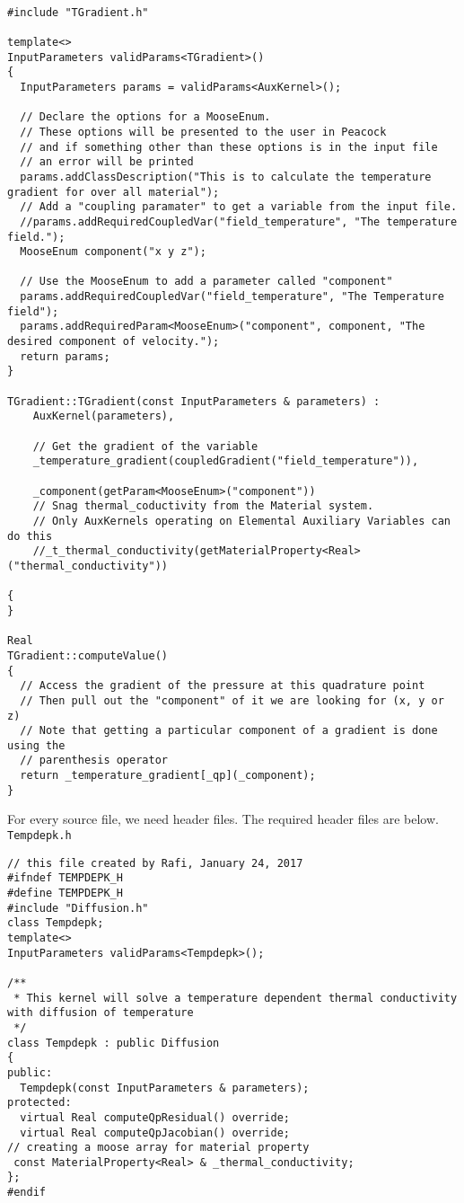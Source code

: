 \begin{lstlisting}

#include "TGradient.h"

template<>
InputParameters validParams<TGradient>()
{
  InputParameters params = validParams<AuxKernel>();

  // Declare the options for a MooseEnum.
  // These options will be presented to the user in Peacock
  // and if something other than these options is in the input file
  // an error will be printed
  params.addClassDescription("This is to calculate the temperature gradient for over all material");
  // Add a "coupling paramater" to get a variable from the input file.
  //params.addRequiredCoupledVar("field_temperature", "The temperature field.");
  MooseEnum component("x y z");

  // Use the MooseEnum to add a parameter called "component"
  params.addRequiredCoupledVar("field_temperature", "The Temperature field");
  params.addRequiredParam<MooseEnum>("component", component, "The desired component of velocity.");
  return params;
}

TGradient::TGradient(const InputParameters & parameters) :
    AuxKernel(parameters),

    // Get the gradient of the variable
    _temperature_gradient(coupledGradient("field_temperature")),

	_component(getParam<MooseEnum>("component"))
    // Snag thermal_coductivity from the Material system.
    // Only AuxKernels operating on Elemental Auxiliary Variables can do this
    //_t_thermal_conductivity(getMaterialProperty<Real>("thermal_conductivity"))

{
}

Real 
TGradient::computeValue()
{
  // Access the gradient of the pressure at this quadrature point
  // Then pull out the "component" of it we are looking for (x, y or z)
  // Note that getting a particular component of a gradient is done using the
  // parenthesis operator
  return _temperature_gradient[_qp](_component);
}
\end{lstlisting}
\pagebreak
For every source file, we need header files. The required header files are below.
\texttt{Tempdepk.h}
\lstset{style=cpp}
\begin{lstlisting}
// this file created by Rafi, January 24, 2017
#ifndef TEMPDEPK_H
#define TEMPDEPK_H
#include "Diffusion.h"
class Tempdepk;
template<>
InputParameters validParams<Tempdepk>();

/**
 * This kernel will solve a temperature dependent thermal conductivity with diffusion of temperature
 */
class Tempdepk : public Diffusion
{
public:
  Tempdepk(const InputParameters & parameters);
protected:
  virtual Real computeQpResidual() override;
  virtual Real computeQpJacobian() override;
// creating a moose array for material property
 const MaterialProperty<Real> & _thermal_conductivity;
};
#endif 

\end{lstlisting}
